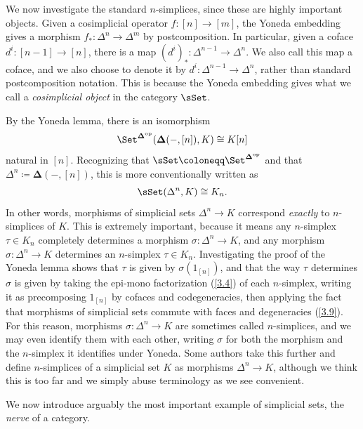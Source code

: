\begin{remark}\label{3.11}
	We now investigate the standard $n$-simplices, since these are highly important objects. Given a cosimplicial operator $f : [n] \to [m]$, the Yoneda embedding gives a morphism $f_*: \Delta ^n \to \Delta ^m$ by postcomposition. In particular, given a coface $d^i : [n-1] \to [n]$, there is a map $(d^i)_* : \Delta ^{n-1}  \to \Delta ^n$. We also call this map a coface, and we also choose to denote it by $d^i : \Delta ^{n-1}  \to \Delta ^n$, rather than standard postcomposition notation. This is because the Yoneda embedding gives what we call a \emph{cosimplicial object} in the category $\sSet $.
\end{remark}

\begin{remark}\label{3.12}
	By the Yoneda lemma, there is an isomorphism
	\[
		\Set ^{\boldsymbol{\Delta} ^{\mathrm{op}} } (\boldsymbol{\Delta} (-,[n]),K)\cong K[n]
	\]
	natural in $[n]$. Recognizing that $\sSet \coloneqq \Set ^{\boldsymbol{\Delta} ^{\mathrm{op}} } $ and that $\Delta ^n \coloneqq \boldsymbol{\Delta} (-,[n])$, this is more conventionally written as
	\[
		\sSet (\Delta ^n,K)\cong K_n
	.\]
	In other words, morphisms of simplicial sets $\Delta ^n \to K$ correspond \emph{exactly} to $n$-simplices of $K$. This is extremely important, because it means any $n$-simplex $\tau \in K_n$ completely determines a morphism $\sigma : \Delta ^n \to K$, and any morphism $\sigma : \Delta ^n \to K$ determines an $n$-simplex $\tau \in K_n$. Investigating the proof of the Yoneda lemma shows that $\tau $ is given by $\sigma (1_{[n]} )$, and that the way $\tau $ determines $\sigma $ is given by taking the epi-mono factorization (\cref{3.4}) of each $n$-simplex, writing it as precomposing $1_{[n]} $ by cofaces and codegeneracies, then applying the fact that morphisms of simplicial sets commute with faces and degeneracies (\cref{3.9}). For this reason, morphisms $\sigma : \Delta ^n \to K$ are sometimes called $n$-simplices, and we may even identify them with each other, writing $\sigma $ for both the morphism and the $n$-simplex it identifies under Yoneda. Some authors take this further and define $n$-simplices of a simplicial set $K$ as morphisms $\Delta ^n \to K$, although we think this is too far and we simply abuse terminology as we see convenient.
\end{remark}


We now introduce arguably the most important example of simplicial sets, the \emph{nerve} of a category.

